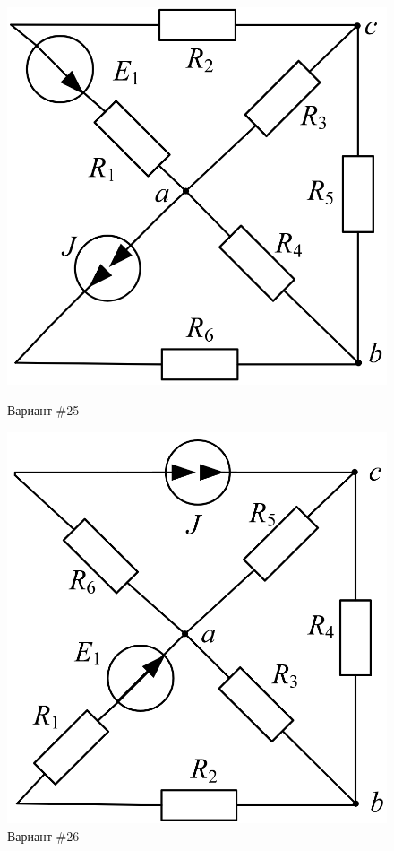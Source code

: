 \begin{figure}[H]
    \centering
    \begin{minipage}{0.48\textwidth}
        \centering
        \includegraphics[width=\textwidth]{images/25_task.png}
        \caption{Вариант \#25}
        \label{fig:task_25}
    \end{minipage}
    \hfill
    \begin{minipage}{0.48\textwidth}
        \centering
        \includegraphics[width=\textwidth]{images/26_task.png}
        \caption{Вариант \#26}
        \label{fig:task_26}
    \end{minipage}
\end{figure}

